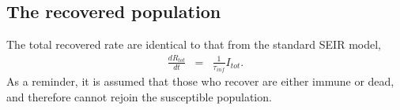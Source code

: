\documentclass[notitlepage, superscriptaddress]{revtex4-2}
\begin{document}
\subsection{The recovered population}

The total recovered rate are identical to that from the standard SEIR model,
\begin{eqnarray}
\label{E:dRtot}
%
\frac{dR_{tot}}{dt} &=& \frac{1}{\tau_{inf}}I_{tot}.
\end{eqnarray}
As a reminder, it is assumed that those who recover are either immune or dead, and therefore cannot rejoin the susceptible population. 

% 
\end{document}
